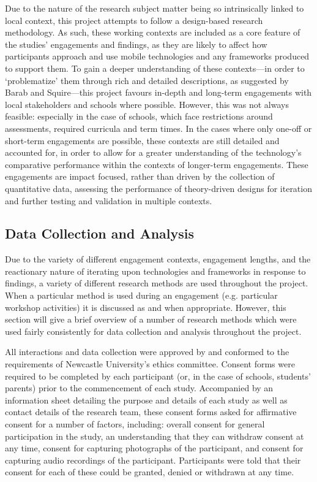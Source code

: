 Due to the nature of the research subject matter being so intrinsically linked to local context, this project attempts to follow a design-based research methodology. As such, these working contexts are included as a core feature of the studies' engagements and findings, as they are likely to affect how participants approach and use mobile technologies and any frameworks produced to support them. To gain a deeper understanding of these contexts---in order to `problematize' them through rich and detailed descriptions, as suggested by Barab and Squire---this project favours in-depth and long-term engagements with local stakeholders and schools where possible. However, this was not always feasible: especially in the case of schools, which face restrictions around assessments, required curricula and term times. In the cases where only one-off or short-term engagements are possible, these contexts are still detailed and accounted for, in order to allow for a greater understanding of the technology's comparative performance within the contexts of longer-term engagements. These engagements are impact focused, rather than driven by the collection of quantitative data, assessing the performance of theory-driven designs for iteration and further testing and validation in multiple contexts.

\subsection{Data Collection and Analysis}

Due to the variety of different engagement contexts, engagement lengths, and the reactionary nature of iterating upon technologies and frameworks in response to findings, a variety of different research methods are used throughout the project. When a particular method is used during an engagement (e.g. particular workshop activities) it is discussed as and when appropriate. However, this section will give a brief overview of a number of research methods which were used fairly consistently for data collection and analysis throughout the project.

All interactions and data collection were approved by and conformed to the requirements of Newcastle University’s ethics committee. Consent forms were required to be completed by each participant (or, in the case of schools, students' parents) prior to the commencement of each study. Accompanied by an information sheet detailing the purpose and details of each study as well as contact details of the research team, these consent forms asked for affirmative consent for a number of factors, including: overall consent for general participation in the study, an understanding that they can withdraw consent at any time, consent for capturing photographs of the participant, and consent for capturing audio recordings of the participant. Participants were told that their consent for each of these could be granted, denied or withdrawn at any time.


